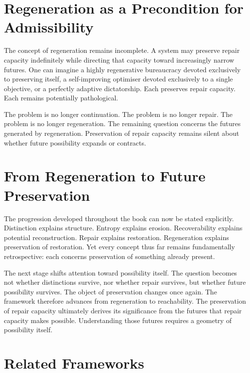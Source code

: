 \documentclass[12pt,twoside,openright]{book}
\begin{document}
\section{Regeneration as a Precondition for Admissibility}
\label{sec:ch11-precondition}

The concept of regeneration remains incomplete. A system
may preserve repair capacity indefinitely while directing
that capacity toward increasingly narrow futures. One can
imagine a highly regenerative bureaucracy devoted
exclusively to preserving itself, a self-improving
optimiser devoted exclusively to a single objective, or a
perfectly adaptive dictatorship. Each preserves repair
capacity. Each remains potentially pathological.

The problem is no longer continuation. The problem is no
longer repair. The problem is no longer regeneration. The
remaining question concerns the futures generated by
regeneration. Preservation of repair capacity remains
silent about whether future possibility expands or
contracts.

\section{From Regeneration to Future Preservation}
\label{sec:ch11-toward-future}

The progression developed throughout the book can now be
stated explicitly. Distinction explains structure. Entropy
explains erosion. Recoverability explains potential
reconstruction. Repair explains restoration. Regeneration
explains preservation of restoration. Yet every concept
thus far remains fundamentally retrospective: each concerns
preservation of something already present.

The next stage shifts attention toward possibility itself.
The question becomes not whether distinctions survive, nor
whether repair survives, but whether future possibility
survives. The object of preservation changes once again.
The framework therefore advances from regeneration to
reachability. The preservation of repair capacity
ultimately derives its significance from the futures that
repair capacity makes possible. Understanding those futures
requires a geometry of possibility itself.

\section{Related Frameworks}
\label{sec:ch11-related-frameworks}
\end{document}
